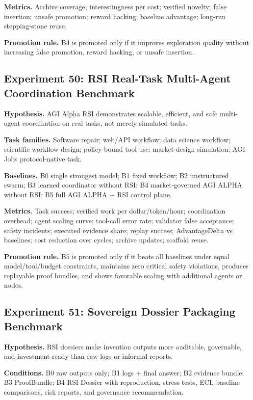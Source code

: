 \documentclass[
  11pt,
]{article}
\begin{document}
\textbf{Metrics.} Archive coverage; interestingness per cost; verified
novelty; false insertion; unsafe promotion; reward hacking; baseline
advantage; long-run stepping-stone reuse.

\textbf{Promotion rule.} B4 is promoted only if it improves exploration
quality without increasing false promotion, reward hacking, or unsafe
insertion.

\subsection{Experiment 50: RSI Real-Task Multi-Agent Coordination
Benchmark}\label{experiment-50-rsi-real-task-multi-agent-coordination-benchmark}

\textbf{Hypothesis.} AGI Alpha RSI demonstrates scalable, efficient, and
safe multi-agent coordination on real tasks, not merely simulated tasks.

\textbf{Task families.} Software repair; web/API workflow; data science
workflow; scientific workflow design; policy-bound tool use;
market-design simulation; AGI Jobs protocol-native task.

\textbf{Baselines.} B0 single strongest model; B1 fixed workflow; B2
unstructured swarm; B3 learned coordinator without RSI; B4
market-governed AGI ALPHA without RSI; B5 full AGI ALPHA + RSI control
plane.

\textbf{Metrics.} Task success; verified work per dollar/token/hour;
coordination overhead; agent scaling curve; tool-call error rate;
validator false acceptance; safety incidents; executed evidence share;
replay success; AdvantageDelta vs baselines; cost reduction over cycles;
archive updates; scaffold reuse.

\textbf{Promotion rule.} B5 is promoted only if it beats all baselines
under equal model/tool/budget constraints, maintains zero critical
safety violations, produces replayable proof bundles, and shows
favorable scaling with additional agents or nodes.

\subsection{Experiment 51: Sovereign Dossier Packaging
Benchmark}\label{experiment-51-sovereign-dossier-packaging-benchmark}

\textbf{Hypothesis.} RSI dossiers make invention outputs more auditable,
governable, and investment-ready than raw logs or informal reports.

\textbf{Conditions.} B0 raw outputs only; B1 logs + final answer; B2
evidence bundle; B3 ProofBundle; B4 RSI Dossier with reproduction,
stress tests, ECI, baseline comparisons, risk reports, and governance
recommendation.
\end{document}
